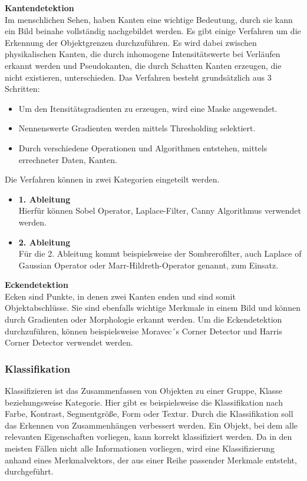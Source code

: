     \textbf{Kantendetektion}\\
    Im menschlichen Sehen, haben Kanten eine wichtige Bedeutung, durch sie kann ein Bild beinahe vollständig nachgebildet werden. Es gibt einige Verfahren um die Erkennung der Objektgrenzen durchzuführen. Es wird dabei zwischen physikalischen Kanten, die durch inhomogene Intensitätswerte bei Verläufen erkannt werden und Pseudokanten, die durch Schatten Kanten erzeugen, die nicht existieren, unterschieden.
    Das Verfahren besteht grundsätzlich aus 3 Schritten:
    \begin{itemize}
        \item Um den Itensitätsgradienten zu erzeugen, wird eine Maske angewendet.
        \item Nennenswerte Gradienten werden mittels Thresholding selektiert.
        \item Durch verschiedene Operationen und Algorithmen entstehen, mittels errechneter Daten, Kanten.
    \end{itemize}
    Die Verfahren können in zwei Kategorien eingeteilt werden.
    \begin{itemize}
        \item \textbf{1. Ableitung}\\
        Hierfür können Sobel Operator, Laplace-Filter, Canny Algorithmus verwendet werden.
        \item \textbf{2. Ableitung}\\
        Für die 2. Ableitung kommt beispielsweise der Sombrerofilter, auch Laplace of Gaussian Operator oder Marr-Hildreth-Operator genannt, zum Einsatz.
    \end{itemize}
    \textbf{Eckendetektion}\\
    Ecken sind Punkte, in denen zwei Kanten enden und sind somit Objektabschlüsse. Sie sind ebenfalls wichtige Merkmale in einem Bild und können durch Gradienten oder Morphologie erkannt werden. Um die Eckendetektion durchzuführen, können beispielsweise Moravec´s Corner Detector und Harris Corner Detector verwendet werden. \cite{Bildverarbeitung}

    \subsubsection{Klassifikation}
    Klassifizieren ist das Zusammenfassen von Objekten zu einer Gruppe, Klasse beziehungsweise Kategorie. Hier gibt es beispielsweise die Klassifikation nach Farbe, Kontrast, Segmentgröße, Form oder Textur. Durch die Klassifikation soll das Erkennen von Zusammenhängen verbessert werden. Ein Objekt, bei dem alle relevanten Eigenschaften vorliegen, kann korrekt klassifiziert werden. Da in den meisten Fällen nicht alle Informationen vorliegen, wird eine Klassifizierung anhand eines Merkmalvektors, der aus einer Reihe passender Merkmale entsteht, durchgeführt. \cite{Bildverarbeitung}

